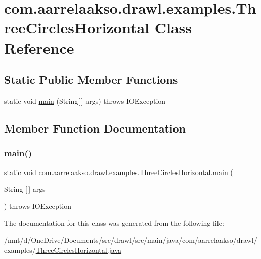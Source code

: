 \hypertarget{classcom_1_1aarrelaakso_1_1drawl_1_1examples_1_1_three_circles_horizontal}{}\section{com.\+aarrelaakso.\+drawl.\+examples.\+Three\+Circles\+Horizontal Class Reference}
\label{classcom_1_1aarrelaakso_1_1drawl_1_1examples_1_1_three_circles_horizontal}
\subsection*{Static Public Member Functions}
\begin{DoxyCompactItemize}
\item 
static void \hyperlink{classcom_1_1aarrelaakso_1_1drawl_1_1examples_1_1_three_circles_horizontal_aa085f6eaaa0a026e69fe1753916afa5e}{main} (String\mbox{[}$\,$\mbox{]} args)  throws I\+O\+Exception 
\end{DoxyCompactItemize}


\subsection{Member Function Documentation}
\mbox{\label{classcom_1_1aarrelaakso_1_1drawl_1_1examples_1_1_three_circles_horizontal_aa085f6eaaa0a026e69fe1753916afa5e}} 
\subsubsection{\texorpdfstring{main()}{main()}}
{\footnotesize\ttfamily static void com.\+aarrelaakso.\+drawl.\+examples.\+Three\+Circles\+Horizontal.\+main (\begin{DoxyParamCaption}\item[{String \mbox{[}$\,$\mbox{]}}]{args }\end{DoxyParamCaption}) throws I\+O\+Exception\hspace{0.3cm}{\ttfamily [static]}}



The documentation for this class was generated from the following file\+:\begin{DoxyCompactItemize}
\item 
/mnt/d/\+One\+Drive/\+Documents/src/drawl/src/main/java/com/aarrelaakso/drawl/examples/\hyperlink{_three_circles_horizontal_8java}{Three\+Circles\+Horizontal.\+java}\end{DoxyCompactItemize}
